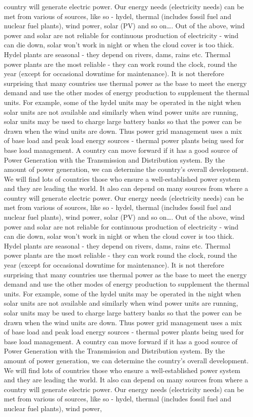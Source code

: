 \documentclass[10pt, a4paper]{article}
\begin{document}
country will generate electric power. Our energy needs (electricity needs) can be met from various of sources, like so - hydel, thermal (includes fossil fuel and nuclear fuel plants), wind power, solar (PV) and so on\dots. Out of the above, wind power and solar are not reliable for continuous production of electricity - wind can die down, solar won’t work in night or when the cloud cover is too thick. Hydel plants are seasonal - they depend on rivers, dams, rains etc. Thermal power plants are the most reliable - they can work round the clock, round the year (except for occasional downtime for maintenance). It is not therefore surprising that many countries use thermal power as the base to meet the energy demand and use the other modes of energy production to supplement the thermal units. For example, some of the hydel units may be operated in the night when solar units are not available and similarly when wind power units are running, solar units may be used to charge large battery banks so that the power can be drawn when the wind units are down. Thus power grid management uses a mix of base load and peak load energy sources - thermal power plants being used for base load management. A country can move forward if it has a good source of Power Generation with the Transmission and Distribution system. By the amount of power generation, we can determine the country’s overall development. We will find lots of countries those who ensure a well-established power system and they are leading the world. It also can depend on many sources from where a country will generate electric power. Our energy needs (electricity needs) can be met from various of sources, like so - hydel, thermal (includes fossil fuel and nuclear fuel plants), wind power, solar (PV) and so on\dots. Out of the above, wind power and solar are not reliable for continuous production of electricity - wind can die down, solar won’t work in night or when the cloud cover is too thick. Hydel plants are seasonal - they depend on rivers, dams, rains etc. Thermal power plants are the most reliable - they can work round the clock, round the year (except for occasional downtime for maintenance). It is not therefore surprising that many countries use thermal power as the base to meet the energy demand and use the other modes of energy production to supplement the thermal units. For example, some of the hydel units may be operated in the night when solar units are not available and similarly when wind power units are running, solar units may be used to charge large battery banks so that the power can be drawn when the wind units are down. Thus power grid management uses a mix of base load and peak load energy sources - thermal power plants being used for base load management. A country can move forward if it has a good source of Power Generation with the Transmission and Distribution system. By the amount of power generation, we can determine the country’s overall development. We will find lots of countries those who ensure a well-established power system and they are leading the world. It also can depend on many sources from where a country will generate electric power. Our energy needs (electricity needs) can be met from various of sources, like so - hydel, thermal (includes fossil fuel and nuclear fuel plants), wind power, 
\end{document}
